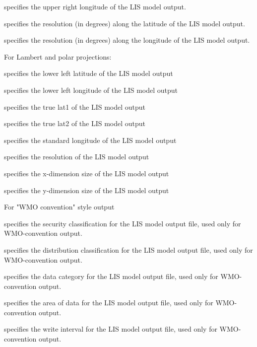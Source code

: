  specifies the upper right longitude of the LIS model output.

 specifies the resolution (in degrees) along the latitude of the
 LIS model output.

 specifies the resolution (in degrees) along the longitude of the
 LIS model output.

 For Lambert and polar projections:

 specifies the lower left latitude of the LIS model output

 specifies the lower left longitude of the LIS model output

 specifies the true lat1 of the LIS model output

 specifies the true lat2 of the LIS model output

 specifies the standard longitude of the LIS model output

 specifies the resolution of the LIS model output

 specifies the x-dimension size of the LIS model output

 specifies the y-dimension size of the LIS model output

 For "WMO convention" style output

 specifies the security classification for the LIS model output file,
 used only for WMO-convention output.

 specifies the distribution classification for the LIS model output file,
 used only for WMO-convention output.

 specifies the data category for the LIS model output file,
 used only for WMO-convention output.

 specifies the area of data for the LIS model output file,
 used only for WMO-convention output.

 specifies the write interval for the LIS model output file,
 used only for WMO-convention output.
 


